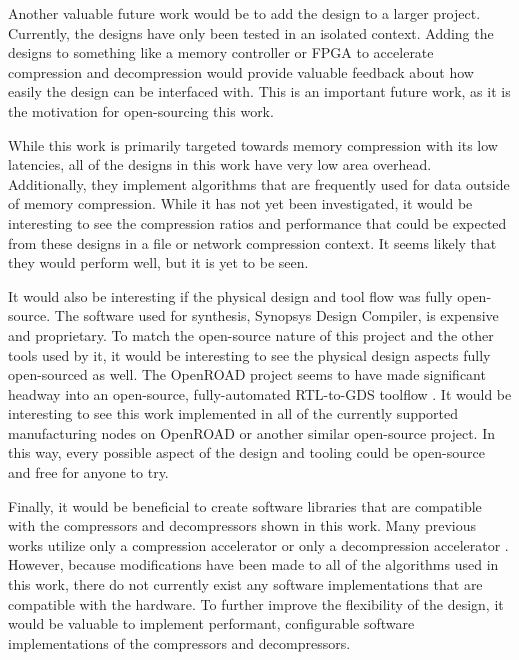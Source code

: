 \documentclass[doublespace,nopageskip]{VTthesis}
\begin{document}
Another valuable future work would be to add the design to a larger project. Currently, the designs have only been tested in an isolated context. Adding the designs to something like a memory controller or FPGA to accelerate compression and decompression would provide valuable feedback about how easily the design can be interfaced with. This is an important future work, as it is the motivation for open-sourcing this work.

While this work is primarily targeted towards memory compression with its low latencies, all of the designs in this work have very low area overhead. Additionally, they implement algorithms that are frequently used for data outside of memory compression. While it has not yet been investigated, it would be interesting to see the compression ratios and performance that could be expected from these designs in a file or network compression context.  It seems likely that they would perform well, but it is yet to be seen.

It would also be interesting if the physical design and tool flow was fully open-source. The software used for synthesis, Synopsys Design Compiler, is expensive and proprietary. To match the open-source nature of this project and the other tools used by it, it would be interesting to see the physical design aspects fully open-sourced as well. The OpenROAD project seems to have made significant headway into an open-source, fully-automated RTL-to-GDS toolflow \cite{openroad}. It would be interesting to see this work implemented in all of the currently supported manufacturing nodes on OpenROAD or another similar open-source project. In this way, every possible aspect of the design and tooling could be open-source and free for anyone to try.

Finally, it would be beneficial to create software libraries that are compatible with the compressors and decompressors shown in this work. Many previous works utilize only a compression accelerator or only a decompression accelerator \cite{hardwarelz4, fpgahuffmanlz77, gziponachip, hdfsgzip, ribeiro, deflatedecompression, lzrw1}. However, because modifications have been made to all of the algorithms used in this work, there do not currently exist any software implementations that are compatible with the hardware.  To further improve the flexibility of the design, it would be valuable to implement performant, configurable software implementations of the compressors and decompressors.

\end{document}
